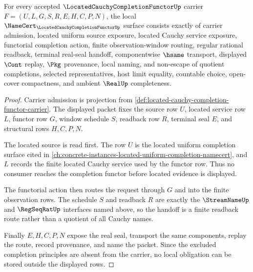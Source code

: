 \begin{theorem}
\label{thm:located-cauchy-completion-functor-namecert-obligations}
For every accepted $\LocatedCauchyCompletionFunctorUp$ carrier $F=(U,L,G,S,R,E,H,C,P,N)$, the local $\NameCert_{\LocatedCauchyCompletionFunctorUp}$ surface consists exactly of carrier admission, located uniform source exposure, located Cauchy service exposure, functorial completion action, finite observation-window routing, regular rational readback, terminal real-seal handoff, componentwise $\hsame$ transport, displayed $\Cont$ replay, $\Pkg$ provenance, local naming, and non-escape of quotient completions, selected representatives, host limit equality, countable choice, open-cover compactness, and ambient $\RealUp$ completeness.
\end{theorem}
\begin{proof}
Carrier admission is projection from \autoref{def:located-cauchy-completion-functor-carrier}. The displayed packet fixes the source row $U$, located service row $L$, functor row $G$, window schedule $S$, readback row $R$, terminal seal $E$, and structural rows $H,C,P,N$.

The located source is read first. The row $U$ is the located uniform completion surface cited in \autoref{ch:concrete-instances-located-uniform-completion-namecert}, and $L$ records the finite located Cauchy service used by the functor row. Thus no consumer reaches the completion functor before located evidence is displayed.

The functorial action then routes the request through $G$ and into the finite observation rows. The schedule $S$ and readback $R$ are exactly the $\StreamNameUp$ and $\RegSeqRatUp$ interfaces named above, so the handoff is a finite readback route rather than a quotient of all Cauchy names.

Finally $E,H,C,P,N$ expose the real seal, transport the same components, replay the route, record provenance, and name the packet. Since the excluded completion principles are absent from the carrier, no local obligation can be stored outside the displayed rows.
\end{proof}

